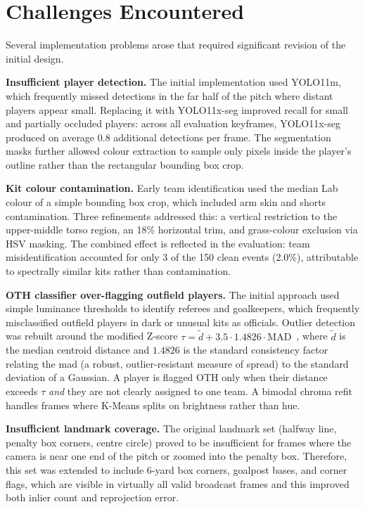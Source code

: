\section{Challenges Encountered}%
\label{sec:impl_challenges}

Several implementation problems arose that required significant revision of the initial design.

\textbf{Insufficient player detection.} The initial implementation used YOLO11m, which frequently missed detections in the far half of the pitch where distant players appear small. Replacing it with YOLO11x-seg improved recall for small and partially occluded players: across all evaluation keyframes, YOLO11x-seg produced on average 0.8 additional detections per frame. The segmentation masks further allowed colour extraction to sample only pixels inside the player's outline rather than the rectangular bounding box crop.

\textbf{Kit colour contamination.} Early team identification used the median Lab colour of a simple bounding box crop, which included arm skin and shorts contamination. Three refinements addressed this: a vertical restriction to the upper-middle torso region, an 18\% horizontal trim, and grass-colour exclusion via HSV masking. The combined effect is reflected in the evaluation: team misidentification accounted for only 3 of the 150 clean events (2.0\%), attributable to spectrally similar kits rather than contamination.

\textbf{OTH classifier over-flagging outfield players.} The initial approach used simple luminance thresholds to identify referees and goalkeepers, which frequently misclassified outfield players in dark or unusual kits as officials. Outlier detection was rebuilt around the modified Z-score $\tau = \tilde{d} + 3.5 \cdot 1.4826 \cdot \mathrm{MAD}$~\cite{iglewicz1993outliers}, where $\tilde{d}$ is the median centroid distance and $1.4826$ is the standard consistency factor relating the \gls{mad} (a robust, outlier-resistant measure of spread) to the standard deviation of a Gaussian. A player is flagged OTH only when their distance exceeds $\tau$ \emph{and} they are not clearly assigned to one team. A bimodal chroma refit handles frames where K-Means splits on brightness rather than hue.

\textbf{Insufficient landmark coverage.} The original landmark set (halfway line, penalty box corners, centre circle) proved to be insufficient for frames where the camera is near one end of the pitch or zoomed into the penalty box. Therefore, this set was extended to include 6-yard box corners, goalpost bases, and corner flags, which are visible in virtually all valid broadcast frames and this improved both inlier count and reprojection error.

